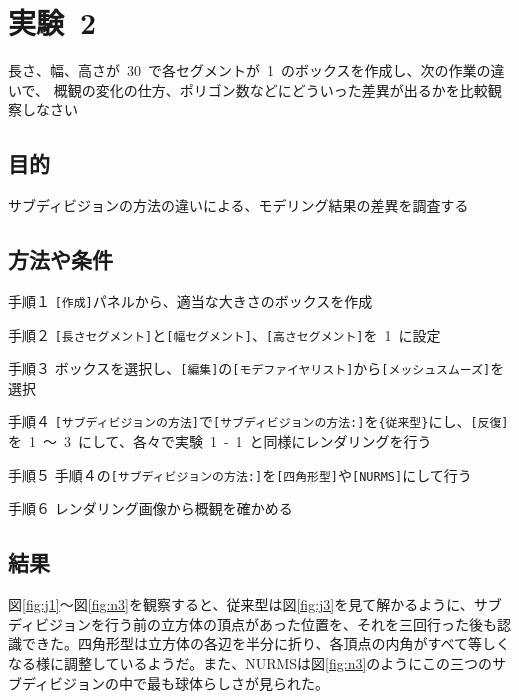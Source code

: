 \documentclass[a4j]{jarticle}
\begin{document}
\newpage
\section{実験\ 2}
長さ、幅、高さが\ 30\ で各セグメントが\ 1\ のボックスを作成し、次の作業の違いで、
概観の変化の仕方、ポリゴン数などにどういった差異が出るかを比較観察しなさい
\subsection{目的}
%
サブディビジョンの方法の違いによる、モデリング結果の差異を調査する
%
\subsection{方法や条件}
%
\begin{description}
\item{手順１} \verb|[作成]|パネルから、適当な大きさのボックスを作成
\item{手順２} \verb|[長さセグメント]|と\verb|[幅セグメント]|、\verb|[高さセグメント]|を\ 1\ に設定
\item{手順３} ボックスを選択し、\verb|[編集]|の\verb|[モデファイヤリスト]|から\verb|[メッシュスムーズ]|を選択
\item{手順４} \verb|[サブディビジョンの方法]|で\verb|[サブディビジョンの方法:]|を\verb|{従来型}|にし、\verb|[反復]|を\ 1\ ～\ 3\ にして、各々で実験\ 1\ -\ 1\ と同様にレンダリングを行う
\item{手順５} 手順４の\verb|[サブディビジョンの方法:]|を\verb|[四角形型]|や\verb|[NURMS]|にして行う
\item{手順６} レンダリング画像から概観を確かめる
\end{description}
%
\subsection{結果}
%
図\ref{fig:j1}～図\ref{fig:n3}を観察すると、従来型は図\ref{fig:j3}を見て解かるように、サブディビジョンを行う前の立方体の頂点があった位置を、それを三回行った後も認識できた。四角形型は立方体の各辺を半分に折り、各頂点の内角がすべて等しくなる様に調整しているようだ。また、NURMSは図\ref{fig:n3}のようにこの三つのサブディビジョンの中で最も球体らしさが見られた。
\end{document}
